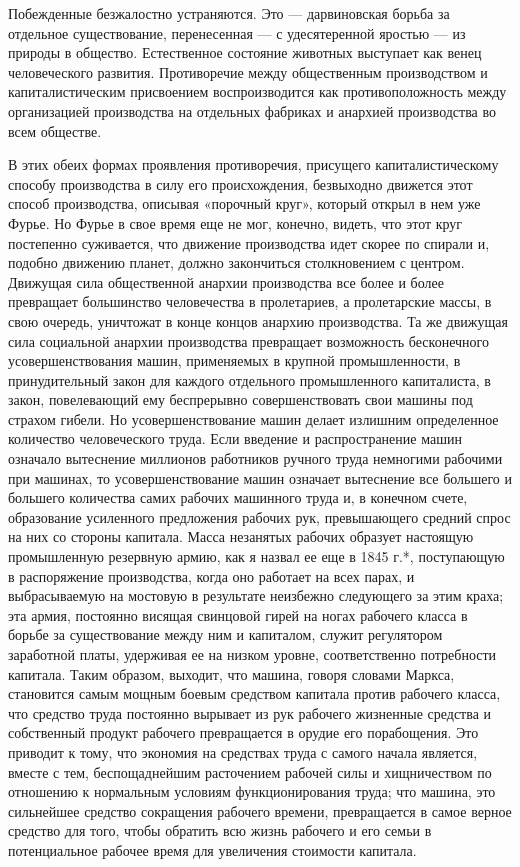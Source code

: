 \documentclass[12pt]{article}
\newcommand{\parnum}{(\arabic{parcount})}
\newcounter{parcount}
\newenvironment{parnumbers}{%
  \par%
  \everypar{\noindent \stepcounter{parcount}\marginpar[]{\parnum}}%
}{}
\begin{document}
\begin{parnumbers}
    Побежденные безжалостно устраняются. Это — дарвиновская борьба за отдельное существование, перенесенная — с удесятеренной яростью — из природы в общество. Естественное состояние животных выступает как венец человеческого развития. Противоречие между общественным производством и капиталистическим присвоением воспроизводится как противоположность между организацией производства на отдельных фабриках и анархией производства во всем обществе.

    В этих обеих формах проявления противоречия, присущего капиталистическому способу производства в силу его происхождения, безвыходно движется этот способ производства, описывая «порочный круг», который открыл в нем уже Фурье. Но Фурье в свое время еще не мог, конечно, видеть, что этот круг постепенно суживается, что движение производства идет скорее по спирали и, подобно движению планет, должно закончиться столкновением с центром. Движущая сила общественной анархии производства все более и более превращает большинство человечества в пролетариев, а пролетарские массы, в свою очередь, уничтожат в конце концов анархию производства. Та же движущая сила социальной анархии производства превращает возможность бесконечного усовершенствования машин, применяемых в крупной промышленности, в принудительный закон для каждого отдельного промышленного капиталиста, в закон, повелевающий ему беспрерывно совершенствовать свои машины под страхом гибели. Но усовершенствование машин делает излишним определенное количество человеческого труда. Если введение и распространение машин означало вытеснение миллионов работников ручного труда немногими рабочими при машинах, то усовершенствование машин означает вытеснение все большего и большего количества самих рабочих машинного труда и, в конечном счете, образование усиленного предложения рабочих рук, превышающего средний спрос на них со стороны капитала. Масса незанятых рабочих образует настоящую промышленную резервную армию, как я назвал ее еще в 1845 г.*, поступающую в распоряжение производства, когда оно работает на всех парах, и выбрасываемую на мостовую в результате неизбежно следующего за этим краха; эта армия, постоянно висящая свинцовой гирей на ногах рабочего класса в борьбе за существование между ним и капиталом, служит регулятором заработной платы, удерживая ее на низком уровне, соответственно потребности капитала. Таким образом, выходит, что машина, говоря словами Маркса, становится самым мощным боевым средством капитала против рабочего класса, что средство труда постоянно вырывает из рук рабочего жизненные средства и собственный продукт рабочего превращается в орудие его порабощения. Это приводит к тому, что экономия на средствах труда с самого начала является, вместе с тем, беспощаднейшим расточением рабочей силы и хищничеством по отношению к нормальным условиям функционирования труда; что машина, это сильнейшее средство сокращения рабочего времени, превращается в самое верное средство для того, чтобы обратить всю жизнь рабочего и его семьи в потенциальное рабочее время для увеличения стоимости капитала.


\end{parnumbers}
\end{document}
